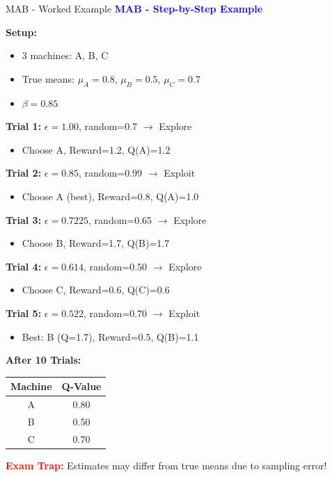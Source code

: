 \documentclass[8pt]{beamer}
\begin{document}
	\begin{frame}{MAB - Worked Example}
		\fontsize{6.5}{7.5}\selectfont
		\textcolor{blue}{\textbf{MAB - Step-by-Step Example}}
		
		\textbf{Setup:}
		\begin{itemize}
			\item 3 machines: A, B, C
			\item True means: $\mu_A = 0.8$, $\mu_B = 0.5$, $\mu_C = 0.7$
			\item $\beta = 0.85$
		\end{itemize}
		
		\textbf{Trial 1:} $\epsilon = 1.00$, random=0.7 $\rightarrow$ Explore
		\begin{itemize}
			\item Choose A, Reward=1.2, Q(A)=1.2
		\end{itemize}
		
		\textbf{Trial 2:} $\epsilon = 0.85$, random=0.99 $\rightarrow$ Exploit
		\begin{itemize}
			\item Choose A (best), Reward=0.8, Q(A)=1.0
		\end{itemize}
		
		\textbf{Trial 3:} $\epsilon = 0.7225$, random=0.65 $\rightarrow$ Explore
		\begin{itemize}
			\item Choose B, Reward=1.7, Q(B)=1.7
		\end{itemize}
		
		\textbf{Trial 4:} $\epsilon = 0.614$, random=0.50 $\rightarrow$ Explore
		\begin{itemize}
			\item Choose C, Reward=0.6, Q(C)=0.6
		\end{itemize}
		
		\textbf{Trial 5:} $\epsilon = 0.522$, random=0.70 $\rightarrow$ Exploit
		\begin{itemize}
			\item Best: B (Q=1.7), Reward=0.5, Q(B)=1.1
		\end{itemize}
		
		\textbf{After 10 Trials:}
		\begin{tabular}{|c|c|}
			\hline
			Machine & Q-Value \\
			\hline
			A & 0.80 \\
			\hline
			B & 0.50 \\
			\hline
			C & 0.70 \\
			\hline
		\end{tabular}
		
		\textcolor{red}{\textbf{Exam Trap:}} Estimates may differ from true means due to sampling error!
	\end{frame}
	
\end{document}
